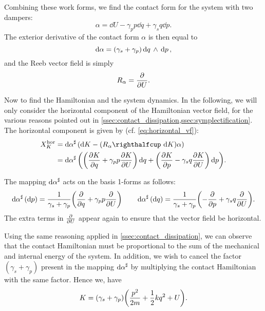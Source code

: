 Combining these work forms, we find the contact form for the system with two dampers:
\begin{equation}
    \alpha = \dd{U} - \gamma_p p\dd{q} + \gamma_s q \dd{p}.
    \label{eq:serial_dho_contact_form}
\end{equation}
The exterior derivative of the contact form \(\alpha\) is then equal to
\begin{equation}
     \dd{\alpha} = (\gamma_s + \gamma_p)  \dd{q}\,\wedge\,\dd{p} ,
\end{equation}
and the Reeb vector field is simply
\begin{equation}
     R_\alpha = \pdv{}{U}.
\end{equation}

Now to find the Hamiltonian and the system dynamics. In the following, we will only consider the horizontal component of the Hamiltonian vector field, for the various reasons pointed out in \cref{ssec:contact_dissipation,ssec:symplectification}. The horizontal component is given by (cf. \cref{eq:horizontal_vf}):
\begin{equation}
    \begin{split}
        X^\text{hor}_K &= \fromDual{\dd{\alpha}}\qty(\dd{K} - (\intpr{R_\alpha}{\dd{K}})\alpha) \\
                       &= \fromDual{\dd{\alpha}}\qty(\qty(\pdv{K}{q} + \gamma_p p \pdv{K}{U})\dd{q} + \qty(\pdv{K}{p} - \gamma_s q \pdv{K}{U})\dd{p}).
    \end{split}
\end{equation}

The mapping \(\dd{\alpha}^\sharp\) acts on the basis 1-forms as follows:
\begin{equation}
     \dd{\alpha}^\sharp(\dd{p}) = \frac{1}{\gamma_s + \gamma_p}\qty(\pdv{}{q} + \gamma_p p\pdv{}{U}) \qquad
    \dd{\alpha}^\sharp(\dd{q}) = \frac{1}{\gamma_s + \gamma_p}\qty(-\pdv{}{p} + \gamma_s q\pdv{}{U}).
\end{equation}
The extra terms in \(\pdv{}{U}\) appear again to ensure that the vector field be horizontal.

Using the same reasoning applied in \cref{ssec:contact_dissipation}, we can observe that the contact Hamiltonian must be proportional to the sum of the mechanical and internal energy of the system. In addition, we wish to cancel the factor \((\gamma_s + \gamma_p)\) present in the mapping \(\dd{\alpha}^\sharp\) by multiplying the contact Hamiltonian with the same factor. Hence we, have
\begin{equation}
     K = (\gamma_s + \gamma_p)\qty(\frac{p^2}{2m} + \frac{1}{2}kq^2 + U).
\end{equation}

